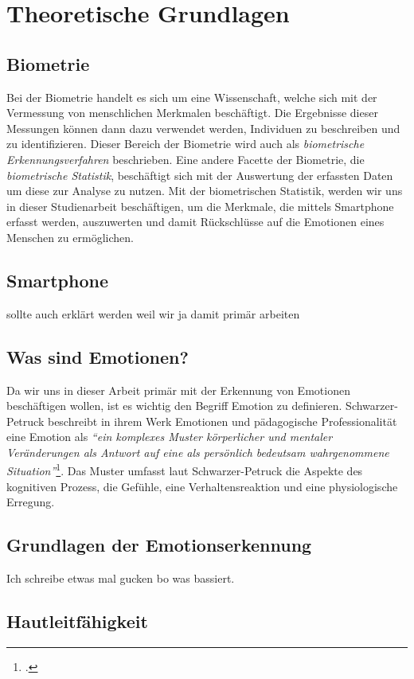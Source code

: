 \section{Theoretische Grundlagen}
\subsection{Biometrie}
Bei der Biometrie handelt es sich um eine Wissenschaft, welche sich mit der Vermessung von menschlichen Merkmalen beschäftigt.
Die Ergebnisse dieser Messungen können dann dazu verwendet werden, Individuen zu beschreiben und zu identifizieren. Dieser Bereich 
der Biometrie wird auch als \textit{biometrische Erkennungsverfahren} beschrieben. Eine andere Facette der Biometrie, die \textit{biometrische Statistik},
beschäftigt sich mit der Auswertung der erfassten Daten um diese zur Analyse zu nutzen.
Mit der biometrischen Statistik, werden wir uns in dieser Studienarbeit beschäftigen, um die Merkmale, die mittels 
Smartphone erfasst werden, auszuwerten und damit Rückschlüsse auf die Emotionen eines Menschen zu ermöglichen.
\subsection{Smartphone}
sollte auch erklärt werden weil wir ja damit primär arbeiten
\subsection{Was sind Emotionen?}
Da wir uns in dieser Arbeit primär mit der Erkennung von Emotionen beschäftigen wollen, ist es wichtig den Begriff Emotion zu definieren.
Schwarzer-Petruck beschreibt in ihrem Werk Emotionen und pädagogische Professionalität eine Emotion als \textit{``ein komplexes
Muster körperlicher und mentaler Veränderungen als Antwort auf eine als persönlich bedeutsam wahrgenommene Situation''}\footcite[S.51 Z.20ff]{Sch13}.
Das Muster umfasst laut Schwarzer-Petruck die Aspekte des kognitiven Prozess, die Gefühle, eine Verhaltensreaktion und eine physiologische Erregung.
\subsection{Grundlagen der Emotionserkennung}
Ich schreibe etwas mal gucken bo was bassiert.
\subsection{Hautleitfähigkeit}
